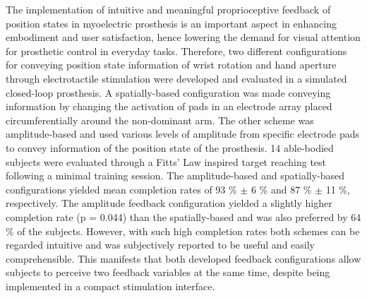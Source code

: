 The implementation of intuitive and meaningful proprioceptive feedback of position states in myoelectric prosthesis is an important aspect in enhancing embodiment and user satisfaction, hence lowering the demand for visual attention for prosthetic control in everyday tasks. Therefore, two different configurations for conveying position state information of wrist rotation and hand aperture through electrotactile stimulation were developed and evaluated in a simulated closed-loop prosthesis. A spatially-based configuration was made conveying information by changing the activation of pads in an electrode array placed circumferentially around the non-dominant arm. The other scheme was amplitude-based and used various levels of amplitude from specific electrode pads to convey information of the position state of the prosthesis. 14 able-bodied subjects were evaluated through a Fitts' Law inspired target reaching test following a minimal training session.
The amplitude-based and spatially-based configurations yielded mean completion rates of 93 \% $\boldsymbol{\pm}$ 6 \% and 87 \% $\boldsymbol{\pm}$ 11 \%, respectively. The amplitude feedback configuration yielded a slightly higher completion rate (p = 0.044) than the spatially-based and was also preferred by 64 \% of the subjects. However, with such high completion rates both schemes can be regarded intuitive and was subjectively reported to be useful and easily comprehensible. This manifests that both developed feedback configurations allow subjects to perceive two feedback variables at the same time, despite being implemented in a compact stimulation interface. 
 
 
 
